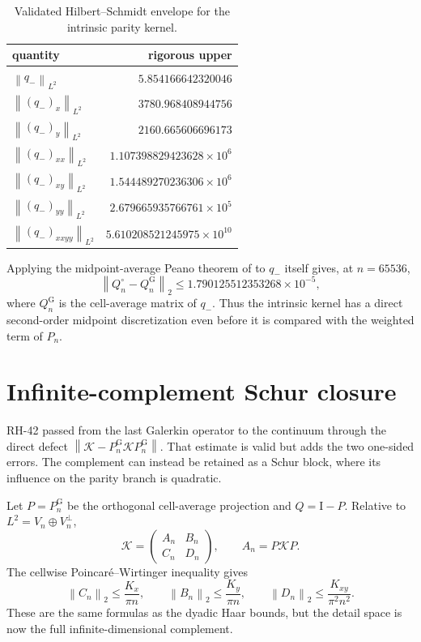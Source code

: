 \documentclass[11pt]{article}
\theoremstyle{definition}
\theoremstyle{remark}
\newcommand{\C}{\mathbb C}
\newcommand{\Id}{\mathrm I}
\newcommand{\cK}{\mathcal K}
\newcommand{\norm}[1]{\left\lVert #1\right\rVert}
\begin{document}
\begin{table}[H]
\centering
\caption{Validated Hilbert--Schmidt envelope for the intrinsic parity kernel.}
\label{tab:kernel-envelope}
\begin{tabular}{@{}lr@{}}
\toprule
quantity & rigorous upper\\
\midrule
$\norm{q_-}_{L^2}$ & $5.854166642320046$\\
$\norm{(q_-)_x}_{L^2}$ & $3780.968408944756$\\
$\norm{(q_-)_y}_{L^2}$ & $2160.665606696173$\\
$\norm{(q_- )_{xx}}_{L^2}$ & $1.107398829423628\times10^6$\\
$\norm{(q_- )_{xy}}_{L^2}$ & $1.544489270236306\times10^6$\\
$\norm{(q_- )_{yy}}_{L^2}$ & $2.679665935766761\times10^5$\\
$\norm{(q_- )_{xxyy}}_{L^2}$ & $5.610208521245975\times10^{10}$\\
\bottomrule
\end{tabular}
\end{table}

Applying the midpoint-average Peano theorem of
\citet{WangEuclidean2026} to $q_-$ itself gives, at $n=65536$,
\begin{equation}
 \norm{Q_n^\circ-Q_n^{\mathrm G}}_2
 \le1.790125512353268\times10^{-5},
 \label{eq:kernel-midpoint-defect}
\end{equation}
where $Q_n^{\mathrm G}$ is the cell-average matrix of $q_-$.  Thus the
intrinsic kernel has a direct second-order midpoint discretization even
before it is compared with the weighted term of $P_n$.

\section{Infinite-complement Schur closure}
\label{sec:complement-schur}

RH-42 passed from the last Galerkin operator to the continuum through the
direct defect
$\norm{\cK-P_n^{\mathrm G}\cK P_n^{\mathrm G}}$.  That estimate is valid
but adds the two one-sided errors.  The complement can instead be retained
as a Schur block, where its influence on the parity branch is quadratic.

Let $P=P_n^{\mathrm G}$ be the orthogonal cell-average projection and
$Q=\Id-P$.  Relative to
$L^2=V_n\oplus V_n^\perp$,
\begin{equation}
 \cK=
 \begin{pmatrix}
  A_n&B_n\\C_n&D_n
 \end{pmatrix},
 \qquad
 A_n=P\cK P.
 \label{eq:continuum-blocks}
\end{equation}
The cellwise Poincar\'e--Wirtinger inequality gives
\begin{equation}
 \norm{C_n}_2\le\frac{K_x}{\pi n},
 \qquad
 \norm{B_n}_2\le\frac{K_y}{\pi n},
 \qquad
 \norm{D_n}_2\le\frac{K_{xy}}{\pi^2n^2}.
 \label{eq:complement-block-bounds}
\end{equation}
These are the same formulas as the dyadic Haar bounds, but the detail space
is now the full infinite-dimensional complement.
\end{document}
